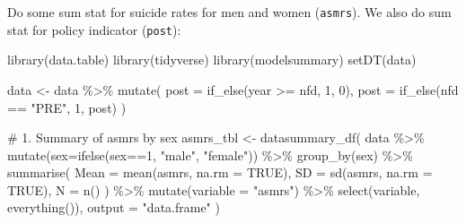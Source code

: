 \documentclass[
  letterpaper,
  DIV=11,
  numbers=noendperiod]{scrartcl}
\newenvironment{Shaded}{\begin{snugshade}}{\end{snugshade}}
\newcommand{\AttributeTok}[1]{\textcolor[rgb]{0.40,0.45,0.13}{#1}}
\newcommand{\CommentTok}[1]{\textcolor[rgb]{0.37,0.37,0.37}{#1}}
\newcommand{\ConstantTok}[1]{\textcolor[rgb]{0.56,0.35,0.01}{#1}}
\newcommand{\DecValTok}[1]{\textcolor[rgb]{0.68,0.00,0.00}{#1}}
\newcommand{\FunctionTok}[1]{\textcolor[rgb]{0.28,0.35,0.67}{#1}}
\newcommand{\NormalTok}[1]{\textcolor[rgb]{0.00,0.23,0.31}{#1}}
\newcommand{\OtherTok}[1]{\textcolor[rgb]{0.00,0.23,0.31}{#1}}
\newcommand{\SpecialCharTok}[1]{\textcolor[rgb]{0.37,0.37,0.37}{#1}}
\newcommand{\StringTok}[1]{\textcolor[rgb]{0.13,0.47,0.30}{#1}}
\begin{document}
Do some sum stat for suicide rates for men and women (\texttt{asmrs}).
We also do sum stat for policy indicator (\texttt{post}):

\begin{Shaded}
\begin{Highlighting}[]
\FunctionTok{library}\NormalTok{(data.table)}
\FunctionTok{library}\NormalTok{(tidyverse)}
\FunctionTok{library}\NormalTok{(modelsummary)}
\FunctionTok{setDT}\NormalTok{(data)}

\NormalTok{data }\OtherTok{\textless{}{-}}\NormalTok{ data }\SpecialCharTok{\%\textgreater{}\%}
  \FunctionTok{mutate}\NormalTok{(}
    \AttributeTok{post =} \FunctionTok{if\_else}\NormalTok{(year }\SpecialCharTok{\textgreater{}=}\NormalTok{ nfd, }\DecValTok{1}\NormalTok{, }\DecValTok{0}\NormalTok{),}
    \AttributeTok{post =} \FunctionTok{if\_else}\NormalTok{(nfd }\SpecialCharTok{==} \StringTok{"PRE"}\NormalTok{, }\DecValTok{1}\NormalTok{, post)}
\NormalTok{  )}

\CommentTok{\# 1. Summary of asmrs by sex}
\NormalTok{asmrs\_tbl }\OtherTok{\textless{}{-}} \FunctionTok{datasummary\_df}\NormalTok{(}
\NormalTok{  data }\SpecialCharTok{\%\textgreater{}\%}
    \FunctionTok{mutate}\NormalTok{(}\AttributeTok{sex=}\FunctionTok{ifelse}\NormalTok{(sex}\SpecialCharTok{==}\DecValTok{1}\NormalTok{, }\StringTok{"male"}\NormalTok{, }\StringTok{"female"}\NormalTok{)) }\SpecialCharTok{\%\textgreater{}\%} 
    \FunctionTok{group\_by}\NormalTok{(sex) }\SpecialCharTok{\%\textgreater{}\%}
    \FunctionTok{summarise}\NormalTok{(}
      \AttributeTok{Mean =} \FunctionTok{mean}\NormalTok{(asmrs, }\AttributeTok{na.rm =} \ConstantTok{TRUE}\NormalTok{),}
      \AttributeTok{SD =} \FunctionTok{sd}\NormalTok{(asmrs, }\AttributeTok{na.rm =} \ConstantTok{TRUE}\NormalTok{),}
      \AttributeTok{N =} \FunctionTok{n}\NormalTok{()}
\NormalTok{    ) }\SpecialCharTok{\%\textgreater{}\%}
    \FunctionTok{mutate}\NormalTok{(}\AttributeTok{variable =} \StringTok{"asmrs"}\NormalTok{) }\SpecialCharTok{\%\textgreater{}\%}
    \FunctionTok{select}\NormalTok{(variable, }\FunctionTok{everything}\NormalTok{()),}
  \AttributeTok{output =} \StringTok{"data.frame"}
\NormalTok{)}


\end{Highlighting}
\end{Shaded}
\end{document}
